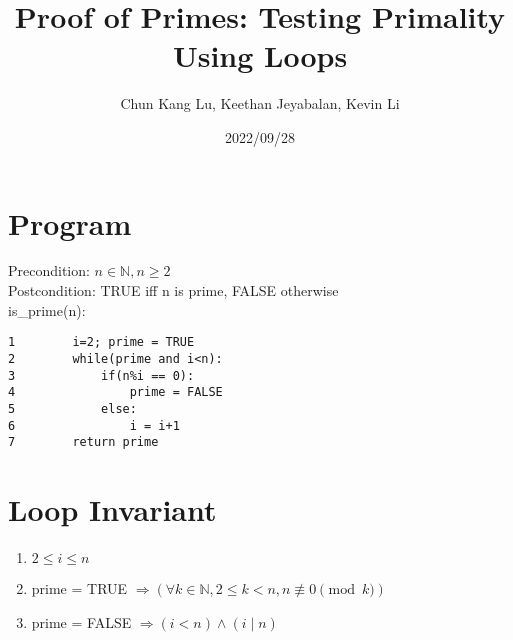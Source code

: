 \documentclass{article}
\title{Proof of Primes: Testing Primality Using Loops}
\author{Chun Kang Lu, Keethan Jeyabalan, Kevin Li}
\date{2022/09/28}
\begin{document}
	\maketitle
	\flushleft
	\section*{Program}
	Precondition: \(n\in \mathbb{N}, n \geq 2 \) \\ 
	Postcondition: TRUE iff n is prime, FALSE otherwise\\
	is\_prime(n): \\
	\begin{verbatim}
1        i=2; prime = TRUE
2        while(prime and i<n):
3            if(n%i == 0):
4                prime = FALSE
5            else:
6                i = i+1
7        return prime
	\end{verbatim}
	\section*{Loop Invariant}
	\begin{enumerate}[label=(\alph*)]
		\item \(2 \leq i \leq n\)
		\item prime = TRUE \(\Longrightarrow(\forall k \in \mathbb{N}, 2 \leq k < n, n \not\equiv 0 \pmod k)\)
		\item prime = FALSE \(\Longrightarrow (i < n) \land (i\mid n)\)
	\end{enumerate}
\end{document}
